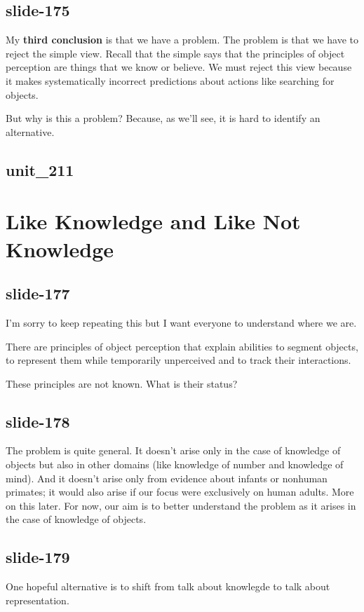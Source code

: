 \documentclass[12pt,\papersize]{extarticle}
\begin{document}
\subsection{slide-175}
My \textbf{third conclusion} is that we have a problem.
The problem is that we have to reject the simple view.
Recall that the simple says that the principles of object perception are things that we know 
or believe.
We must reject this view because it makes systematically incorrect predictions about actions 
like searching for objects.
 
But why is this a problem? Because, as we'll see, it is hard to identify an alternative.
 
\subsection{unit\_211}
 
 
\section{Like Knowledge and Like Not Knowledge}
 
\subsection{slide-177}
I'm sorry to keep repeating this but I want everyone to understand where we are.
 
There are principles of object perception that explain abilities to segment objects, to represent them while temporarily unperceived and to track their interactions.
 
These principles are not known.  What is their status?
 
\subsection{slide-178}
The problem is quite general.
It doesn't arise only in the case of knowledge of objects but also in other domains 
(like knowledge of number and knowledge of mind).
And it doesn't arise only from evidence about infants or nonhuman primates; it would also 
arise if our focus were exclusively on human adults.
More on this later.
For now, our aim is to better understand the problem as it arises in the case of knowledge of objects.
 
\subsection{slide-179}
One hopeful alternative is to shift from talk about knowlegde to talk about representation.
 
\end{document}
